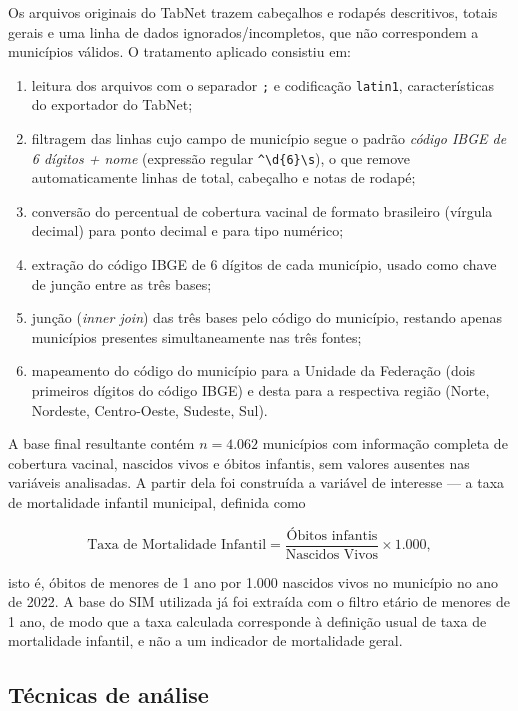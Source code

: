 \documentclass[pdflatex,sn-mathphys-num]{sn-jnl}
\begin{document}
Os arquivos originais do TabNet trazem cabeçalhos e rodapés descritivos, totais gerais e uma linha de dados ignorados/incompletos, que não correspondem a municípios válidos. O tratamento aplicado consistiu em:

\begin{enumerate}
\item leitura dos arquivos com o separador \texttt{;} e codificação \texttt{latin1}, características do exportador do TabNet;
\item filtragem das linhas cujo campo de município segue o padrão \emph{código IBGE de 6 dígitos + nome} (expressão regular \texttt{\^{}\textbackslash d\{6\}\textbackslash s}), o que remove automaticamente linhas de total, cabeçalho e notas de rodapé;
\item conversão do percentual de cobertura vacinal de formato brasileiro (vírgula decimal) para ponto decimal e para tipo numérico;
\item extração do código IBGE de 6 dígitos de cada município, usado como chave de junção entre as três bases;
\item junção (\emph{inner join}) das três bases pelo código do município, restando apenas municípios presentes simultaneamente nas três fontes;
\item mapeamento do código do município para a Unidade da Federação (dois primeiros dígitos do código IBGE) e desta para a respectiva região (Norte, Nordeste, Centro-Oeste, Sudeste, Sul).
\end{enumerate}

A base final resultante contém $n = 4{.}062$ municípios com informação completa de cobertura vacinal, nascidos vivos e óbitos infantis, sem valores ausentes nas variáveis analisadas. A partir dela foi construída a variável de interesse — a taxa de mortalidade infantil municipal, definida como

\begin{equation}
\text{Taxa de Mortalidade Infantil} = \frac{\text{Óbitos infantis}}{\text{Nascidos Vivos}} \times 1{.}000 ,
\label{eq:taxa}
\end{equation}

isto é, óbitos de menores de 1 ano por 1.000 nascidos vivos no município no ano de 2022. A base do SIM utilizada já foi extraída com o filtro etário de menores de 1 ano, de modo que a taxa calculada corresponde à definição usual de taxa de mortalidade infantil, e não a um indicador de mortalidade geral.

\subsection{Técnicas de análise}
\end{document}
